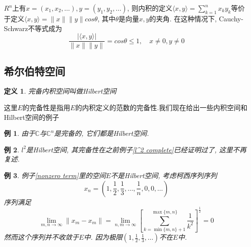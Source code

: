 \documentclass{book}
\newtheorem{definition}{\hspace{2em}定义}[section]
\newtheorem{example}{例}[section]
\begin{document}
$R^n$上有$x=(x_1,x_2,\dots),y=(y_1,y_2,\dots)$, 则内积的定义$\langle x,y\rangle=\sum_{k=1}^{n}x_ky_k$等价于定义$\langle x,y\rangle=\|x\|\|y\|cos\theta$, 其中$\theta$是向量$x,y$的夹角. 在这种情况下, Cauchy-Schwarz不等式成为
\begin{equation*}
  \frac{|\langle x,y\rangle|}{\|x\|\|y\|}=cos\theta\leq 1,\quad x\neq0,y\neq0
\end{equation*}
\subsection*{希尔伯特空间}
\begin{definition}
  完备内积空间叫做Hilbert空间
\end{definition}
这里$E$的完备性是指用$E$的内积定义的范数的完备性.我们现在给出一些内积空间和Hilbert空间的例子
\begin{example}
  由于$\mathbb{C}$与$\mathbb{C}^n$是完备的, 它们都是Hilbert空间.
\end{example}
\begin{example}
  $l^2$是Hilbert空间, 其完备性在之前例子\ref{l^2 complete}已经证明过了, 这里不再复述.
\end{example}
\begin{example}
  例子\ref{nonzero term}里的空间$E$不是Hilbert空间, 考虑柯西序列序列
  \begin{equation*}
    x_n=(1,\frac{1}{2},\frac{1}{3},\dots,\frac{1}{n},0,0,\dots)
  \end{equation*}
  序列满足
  \begin{equation*}
    \lim_{m,n\to\infty}\|x_m-x_m\|=\lim_{n,m\to\infty}\left[\sum_{k=\min{\{m,n\}+1}}^{\max\{m,n\}}\frac{1}{k^2}\right]^{\frac{1}{2}}=0
  \end{equation*}
  然而这个序列并不收敛于$E$中. 因为极限$(1,\frac{1}{2},\frac{1}{3},\dots)$不在$E$中.
\end{example}
\end{document}
